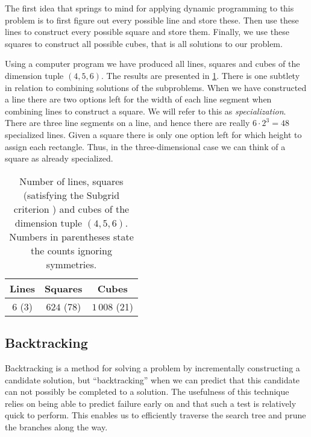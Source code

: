 The first idea that springs to mind for applying dynamic programming to this problem is to first figure out every possible line and store these. Then use these lines to construct every possible square and store them. Finally, we use these squares to construct all possible cubes, that is all solutions to our problem.

\begin{observation}
Using a computer program we have produced all lines, squares and cubes of the dimension tuple $(4, 5, 6)$. The results are presented in \cref{table:3d-dp-counts}. There is one subtlety in relation to combining solutions of the subproblems. When we have constructed a line there are two options left for the width of each line segment when combining lines to construct a square. We will refer to this as \textit{specialization}. There are three line segments on a line, and hence there are really $6 \cdot 2^3 = 48$ specialized lines. Given a square there is only one option left for which height to assign each rectangle. Thus, in the three-dimensional case we can think of a square as already specialized.

\begin{table}[ht]
\centering
\caption{Number of lines, squares (satisfying the Subgrid criterion ) and cubes of the dimension tuple $(4, 5, 6)$. Numbers in parentheses state the counts ignoring symmetries.}
\label{table:3d-dp-counts}
\bgroup
\def\arraystretch{1.1}
\begin{tabular}{|c|c|c|}
\hline
Lines   & Squares  & Cubes     \\ \hline
$6$ (3) & $624$ (78) & $1\,008$ (21) \\ \hline
\end{tabular}
\egroup
\end{table}
\end{observation}

\subsection{Backtracking}
Backtracking is a method for solving a problem by incrementally constructing a candidate solution, but ``backtracking'' when we can predict that this candidate can not possibly be completed to a solution. The usefulness of this technique relies on being able to predict failure early on and that such a test is relatively quick to perform. This enables us to efficiently traverse the search tree and prune the branches along the way.

